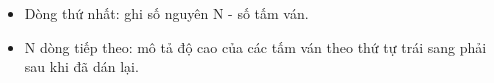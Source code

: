 \begin{itemize}
	\item     Dòng thứ nhất: ghi số nguyên N - số tấm ván.   
	\item     N dòng tiếp theo: mô tả độ cao của các tấm ván theo thứ tự trái sang phải sau khi đã dán lại.   
\end{itemize}
